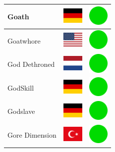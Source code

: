 \documentclass[12pt, a4paper, twoside]{report}
\begin{document}
\begin{center}
\begin{longtable}{|p{5cm}|p{2cm}|p{2cm}|}
Goath & \includegraphics[width=1cm]{4x3/de} & \includegraphics[width=1cm]{likes/y} \\ \hline
Goatwhore & \includegraphics[width=1cm]{4x3/us} & \includegraphics[width=1cm]{likes/y} \\ \hline
God Dethroned & \includegraphics[width=1cm]{4x3/nl} & \includegraphics[width=1cm]{likes/y} \\ \hline
GodSkill & \includegraphics[width=1cm]{4x3/de} & \includegraphics[width=1cm]{likes/y} \\ \hline
Godslave & \includegraphics[width=1cm]{4x3/de} & \includegraphics[width=1cm]{likes/y} \\ \hline
Gore Dimension & \includegraphics[width=1cm]{4x3/tr} & \includegraphics[width=1cm]{likes/y} \\ \hline

\end{longtable}
\end{center}
\end{document}
